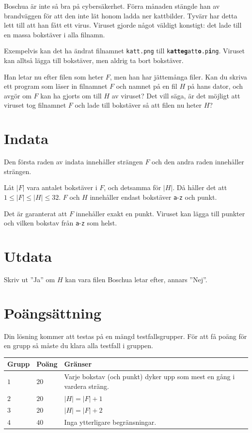 
\noindent

Boschua är inte så bra på cybersäkerhet. Förra månaden stängde han av brandväggen för att den
inte lät honom ladda ner kattbilder. Tyvärr har detta lett till att han fått ett virus. 
Viruset gjorde något väldigt konstigt: det lade till en massa bokstäver i alla filnamn.

Exempelvis kan det ha ändrat filnamnet \texttt{katt.png} till \texttt{k\textbf{atteg}att\textbf{o}.p\textbf{i}ng}.
Viruset kan alltså lägga till bokstäver, men aldrig ta bort bokstäver.

Han letar nu  efter filen som heter $F$, men han har jättemånga filer. Kan du skriva ett program som läser in
filnamnet $F$ och namnet på en fil $H$ på hans dator, och avgör om $F$ kan ha gjorts om till $H$ av viruset?
Det vill säga, är det möjligt att viruset tog filnamnet $F$ och lade till bokstäver så att filen nu heter $H$?


\section*{Indata}
Den första raden av indata innehåller strängen $F$ och den andra raden innehåller strängen.

Låt $|F|$ vara antalet bokstäver i $F$, och detsamma för $|H|$.
Då håller det att $1 \le |F| \le |H| \le 32$. $F$ och $H$ innehåller endast bokstäver \texttt{a}-\texttt{z} och punkt.

Det är garanterat att $F$ innehåller exakt en punkt. Viruset kan lägga till punkter och vilken bokstav från
\texttt{a}-\texttt{z} som helst.


\section*{Utdata}
Skriv ut ''Ja'' om $H$ kan vara filen Boschua letar efter, annars ''Nej''.

\section*{Poängsättning}
Din lösning kommer att testas på en mängd testfallsgrupper.
För att få poäng för en grupp så måste du klara alla testfall i gruppen.


\noindent
\begin{tabular}{| l | l | p{12cm} |}
  \hline
  \textbf{Grupp} & \textbf{Poäng} & \textbf{Gränser} \\ \hline
  $1$    & $20$       & Varje bokstav (och punkt) dyker upp som mest en gång i vardera sträng. \\ \hline
  $2$    & $20$       & $|H| = |F|+1$ \\ \hline
  $3$    & $20$       & $|H| = |F|+2$ \\ \hline
  $4$    & $40$       & Inga ytterligare begränsningar. \\ \hline
\end{tabular}


